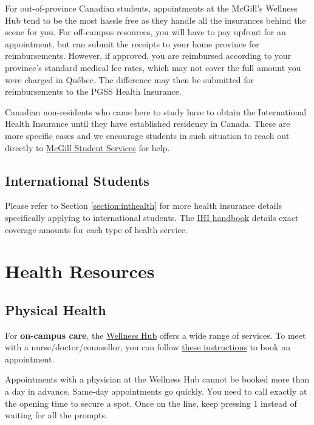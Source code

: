     For out-of-province Canadian students, appointments at the McGill's Wellness Hub tend to be the most hassle free as they handle all the insurances behind the scene for you. For off-campus resources, you will have to pay upfront for an appointment, but can submit the receipts to your home province for reimbursements. However, if approved, you are reimbursed according to your province's standard medical fee rates, which may not cover the full amount you were charged in Québec. The difference may then be submitted for reimbursements to the PGSS Health Insurance.

    Canadian non-residents who came here to study have to obtain the International Health Insurance until they have established residency in Canada. These are more specific cases and we encourage students in such situation to reach out directly to \href{https://www.mcgill.ca/student-accounts/tuition-fees/non-tuition-charges/insurance}{McGill Student Services} for help.
    
\subsection{International Students}

    Please refer to Section  
\hyperref[section:inthealth]{\textcolor{purble}{\ref*{section:inthealth}}}
    for more health insurance details specifically applying to international students. The \href{https://www.mcgill.ca/internationalstudents/health/benefits/handbook}{IHI handbook} details exact coverage amounts for each type of health service. 
    
\section{Health Resources}

    \subsection{Physical Health}

    For \textbf{on-campus care}, the \href{https://www.mcgill.ca/wellness-hub/}{Wellness Hub} offers a wide range of services. To meet with a nurse/doctor/counsellor, you can follow \href{https://www.mcgill.ca/wellness-hub/contact}{these instructions} to book an appointment.

    \begin{plaincorollary}
    Appointments with a physician at the Wellness Hub cannot be booked more than a day in advance. Same-day appointments go quickly. You need to call exactly at the opening time to secure a spot. Once on the line, keep pressing 1 instead of waiting for all the prompts.
    \end{plaincorollary}

